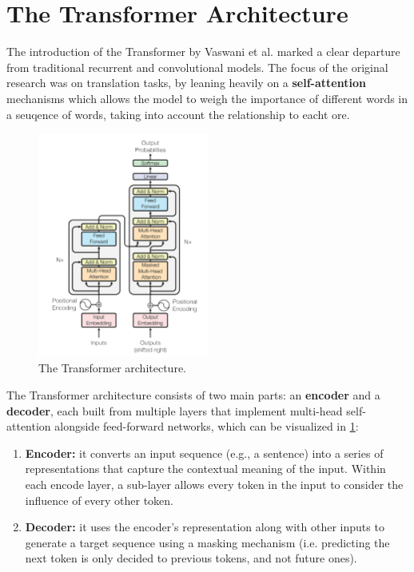 \section{The Transformer Architecture}
\label{sec:transformer-architecture}

The introduction of the Transformer by Vaswani et al. \cite{vaswani2017attention} marked a clear departure from traditional recurrent and convolutional models. The focus of the original research was on translation tasks, by leaning heavily on a \textbf{self-attention} mechanisms which allows the model to weigh the importance of different words in a seuqence of words, taking into account the relationship to eacht ore.

\begin{figure}[t]
    \centering
    \includegraphics[width=0.5\textwidth]{images/transfomer-architecture.png}
    \caption{The Transformer architecture.}
    \label{fig:transfomer}
\end{figure}

The Transformer architecture consists of two main parts: an \textbf{encoder} and a \textbf{decoder}, each built from multiple layers that implement multi-head self-attention alongside feed-forward networks, which can be visualized in \ref{fig:transfomer}:

\begin{enumerate}
    \item \textbf{Encoder:} it converts an input sequence (e.g., a sentence) into a series of representations that capture the contextual meaning of the input. Within each encode layer, a sub-layer allows every token in the input to consider the influence of every other token.
    \item \textbf{Decoder:} it uses the encoder’s representation along with other inputs to generate a target sequence using a masking mechanism (i.e. predicting the next token is only decided to previous tokens, and not future ones).
\end{enumerate}


